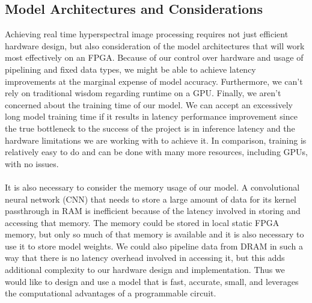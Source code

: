 \documentclass{article}
\newcommand{\mycomment}[1]{}
\begin{document}
\subsection{Model Architectures and Considerations}
Achieving real time hyperspectral image processing requires not just efficient hardware design, but also consideration of the model architectures that will work most effectively on an FPGA. Because of our control over hardware and usage of pipelining and fixed data types, we might be able to achieve latency improvements at the marginal expense of model accuracy. Furthermore, we can't rely on traditional wisdom regarding runtime on a GPU. Finally, we aren't concerned about the training time of our model. We can accept an excessively long model training time if it results in latency performance improvement since the true bottleneck to the success of the project is in inference latency and the hardware limitations we are working with to achieve it. In comparison, training is relatively easy to do and can be done with many more resources, including GPUs, with no issues.\\\\
It is also necessary to consider the memory usage of our model. A convolutional neural network (CNN) that needs to store a large amount of data for its kernel passthrough in RAM is inefficient because of the latency involved in storing and accessing that memory. The memory could be stored in local static FPGA memory\mycomment{what is a better name for this?}, but only so much of that memory is available and it is also necessary to use it to store model weights. We could also pipeline data from DRAM in such a way that there is no latency overhead involved in accessing it, but this adds additional complexity to our hardware design and implementation. Thus we would like to design and use a model that is fast, accurate, small, and leverages the computational advantages of a programmable circuit.
\end{document}
